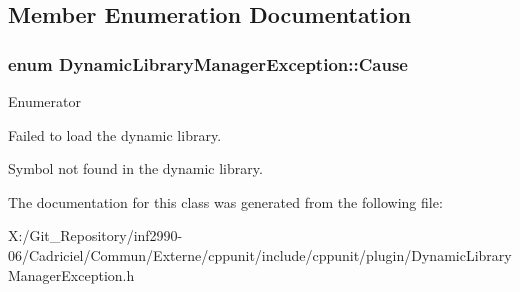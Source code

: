 \subsection{Member Enumeration Documentation}
\hypertarget{class_dynamic_library_manager_exception_a73b4694c152e0693fbc19fb04987a0b9}{
\subsubsection[{Cause}]{\setlength{\rightskip}{0pt plus 5cm}enum {\bf Dynamic\-Library\-Manager\-Exception\-::\-Cause}}}\label{class_dynamic_library_manager_exception_a73b4694c152e0693fbc19fb04987a0b9}
\begin{Desc}
\item[Enumerator]\par
\begin{description}
\item[{\em 
\hypertarget{class_dynamic_library_manager_exception_a73b4694c152e0693fbc19fb04987a0b9a778b42fb996bf018bdc26934649cad63}{loading\-Failed}\label{class_dynamic_library_manager_exception_a73b4694c152e0693fbc19fb04987a0b9a778b42fb996bf018bdc26934649cad63}
}]Failed to load the dynamic library. \item[{\em 
\hypertarget{class_dynamic_library_manager_exception_a73b4694c152e0693fbc19fb04987a0b9a193fc58bb852e09790da269e2b613045}{symbol\-Not\-Found}\label{class_dynamic_library_manager_exception_a73b4694c152e0693fbc19fb04987a0b9a193fc58bb852e09790da269e2b613045}
}]Symbol not found in the dynamic library. \end{description}
\end{Desc}


The documentation for this class was generated from the following file\-:\begin{DoxyCompactItemize}
\item 
X\-:/\-Git\-\_\-\-Repository/inf2990-\/06/\-Cadriciel/\-Commun/\-Externe/cppunit/include/cppunit/plugin/Dynamic\-Library\-Manager\-Exception.\-h\end{DoxyCompactItemize}
